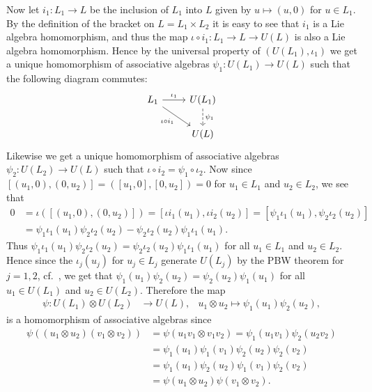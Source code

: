 Now let $i_1\colon L_1\to L$ be the inclusion of $L_1$ into $L$ given by $u\mapsto (u,0)$ for $u\in L_1$. By the definition of the bracket on $L=L_1\times L_2$ it is easy to see that $i_1$ is a Lie algebra homomorphism, and thus the map $\iota\circ i_1\colon L_1\to L\to U(L)$ is also a Lie algebra homomorphism. Hence by the universal property of $(U(L_1),\iota_1)$ we get a unique homomorphism of associative algebras $\psi_1\colon U(L_1)\to U(L)$ such that the following diagram commutes:
\[
  \begin{tikzcd}
    L_1 \ar[r,"\iota_1"]\ar[dr,"\iota\circ i_1",swap] & U(L_1)\ar[d,dashed,"\psi_1"] \\
    & U(L)
  \end{tikzcd}
\]
Likewise we get a unique homomorphism of associative algebras $\psi_2\colon U(L_2)\to U(L)$ such that $\iota\circ i_2 = \psi_1\circ \iota_2$. Now since $[(u_1,0),(0,u_2)]=([u_1,0],[0,u_2])=0$ for $u_1\in L_1$ and $u_2\in L_2$, we see that
\begin{align*}
  0 &= \iota([(u_1,0),(0,u_2)]) = [\iota i_1(u_1),\iota i_2(u_2)] = [\psi_1 \iota_1(u_1),\psi_2 \iota_2(u_2)] \\
  &= \psi_1\iota_1(u_1)\psi_2\iota_2(u_2) - \psi_2\iota_2(u_2)\psi_1\iota_1(u_1).
\end{align*}
Thus $\psi_1\iota_1(u_1)\psi_2\iota_2(u_2)=\psi_2\iota_2(u_2)\psi_1\iota_1(u_1)$ for all $u_1\in L_1$ and $u_2\in L_2$. Hence since the $\iota_j(u_j)$ for $u_j\in L_j$ generate $U(L_j)$ by the PBW theorem for $j=1,2$, cf.\ \cite[p.~E-7]{jantzen}, we get that $\psi_1(u_1)\psi_2(u_2)=\psi_2(u_2)\psi_1(u_1)$ for all $u_1\in U(L_1)$ and $u_2\in U(L_2)$. Therefore the map
\begin{align}\label{eq:U(L)iso}
  \psi\colon U(L_1)\otimes U(L_2)&\to U(L), & u_1\otimes u_2\mapsto \psi_1(u_1)\psi_2(u_2),
\end{align}
is a homomorphism of associative algebras since
\begin{align*}
  \psi((u_1\otimes u_2)(v_1\otimes v_2)) &= \psi(u_1v_1\otimes v_1v_2) = \psi_1(u_1v_1)\psi_2(u_2v_2)\\
                                        &= \psi_1(u_1)\psi_1(v_1)\psi_2(u_2)\psi_2(v_2)\\
                                        &= \psi_1(u_1)\psi_2(u_2)\psi_1(v_1)\psi_2(v_2)\\
                                        &= \psi(u_1\otimes u_2)\psi(v_1\otimes v_2).
\end{align*}

